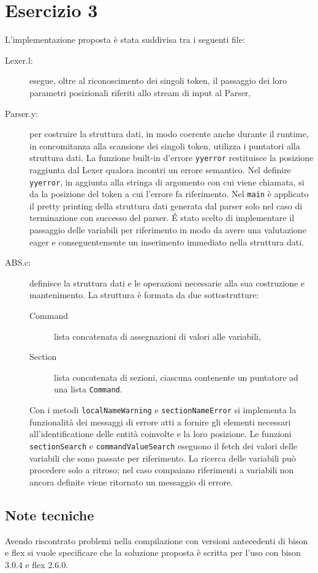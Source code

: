 \documentclass[a4paper,oneside,11pt]{article}
\begin{document}
\section*{Esercizio 3}
L'implementazione proposta è stata suddivisa tra i seguenti file:
\begin{description}
	\item[Lexer.l:] esegue, oltre al riconoscimento dei singoli token, il passaggio dei loro parametri posizionali riferiti allo stream di input al Parser,
	\item[Parser.y:] per costruire la struttura dati, in modo coerente anche durante il runtime, in concomitanza alla scansione dei singoli token, utilizza i puntatori alla struttura dati.
		La funzione built-in d'errore \texttt{yyerror} restituisce la posizione raggiunta dal Lexer qualora incontri un errore semantico.
		Nel definire \texttt{yyerror}, in aggiunta alla stringa di argomento con cui viene chiamata, si da la posizione del token a cui l'errore fa riferimento. 
		Nel \texttt{main} è applicato il pretty printing della struttura dati generata dal parser solo nel caso di terminazione con successo del parser.
		\'E stato scelto di implementare il passaggio delle variabili per riferimento in modo da avere una valutazione eager e conseguentemente un inserimento immediato nella struttura dati.
	\item[ABS.c:] definisce la struttura dati e le operazioni necessarie alla sua costruzione e mantenimento.
		La struttura è formata da due sottostrutture:
		\begin{description}
			\item[Command] lista concatenata di assegnazioni di valori alle variabili,
			\item[Section] lista concatenata di sezioni, ciascuna contenente un puntatore ad una lista \texttt{Command}.
		\end{description}
		Con i metodi \texttt{localNameWarning} e \texttt{sectionNameError} si implementa la funzionalità dei messaggi di errore atti a fornire gli elementi necessari all'identificatione delle entità coinvolte e la loro posizione.
		Le funzioni \texttt{sectionSearch} e \texttt{commandValueSearch} eseguono il fetch dei valori delle variabili che sono passate per riferimento.
		La ricerca delle variabili può procedere solo a ritroso; nel caso compaiano riferimenti a variabili non ancora definite viene ritornato un messaggio di errore.
\end{description}
\subsection*{Note tecniche}
Avendo riscontrato problemi nella compilazione con versioni antecedenti di bison e flex si vuole specificare che la soluzione proposta è scritta per l'uso con bison 3.0.4 e flex 2.6.0.
\end{document}
